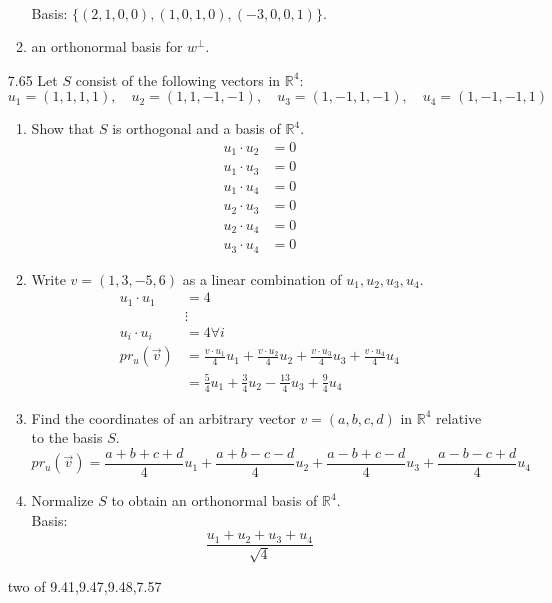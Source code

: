 \documentclass[12pt]{article}
\theoremstyle{definition}
\theoremstyle{plain}
\begin{document}
\begin{enumerate}
\begin{enumerate}
\begin{align*}
		\end{align*}
		Basis: $\{(2,1,0,0),(1,0,1,0),(-3,0,0,1)\}$.
	\item an orthonormal basis for $w^\perp$.
	\end{enumerate}
\item[7.65]Let $S$ consist of the following vectors in $\mathbb{R}^4$:
\[ u_1=(1,1,1,1), \quad u_2=(1,1,-1,-1), \quad u_3=(1,-1,1,-1), \quad u_4=(1,-1,-1,1) \]
	\begin{enumerate}
	\item Show that $S$ is orthogonal and a basis of $\mathbb{R}^4$.\\
		\begin{align*}
		u_1\cdot u_2&=0\\
		u_1\cdot u_3 &= 0\\
		u_1\cdot u_4 &= 0\\
		u_2\cdot u_3 &= 0\\
		u_2\cdot u_4 &= 0\\
		u_3\cdot u_4&= 0
		\end{align*}
	\item Write $v=(1,3,-5,6)$ as a linear combination of $u_1,u_2,u_3,u_4$.
		\begin{align*}
		u_1\cdot u_1 &= 4\\
		&\vdots\\
		u_i\cdot u_i &= 4 \forall i\\
		pr_u(\vec{v})&=\frac{v\cdot u_1}{4}u_1+\frac{v\cdot u_2}{4}u_2+\frac{v\cdot u_3}{4}u_3+\frac{v\cdot u_4}{4}u_4\\
		&=\frac{5}{4}u_1+\frac{3}{4}u_2-\frac{13}{4}u_3+\frac{9}{4}u_4
		\end{align*}
	\item Find the coordinates of an arbitrary vector $v=(a,b,c,d)$ in $\mathbb{R}^4$ relative to the basis $S$.\\
		\[ pr_u(\vec{v}) = \frac{a+b+c+d}{4}u_1+\frac{a+b-c-d}{4}u_2+\frac{a-b+c-d}{4}u_3+\frac{a-b-c+d}{4}u_4 \]
	\item Normalize $S$ to obtain an orthonormal basis of $\mathbb{R}^4$.\\
		Basis: 
		\[ \frac{u_1+u_2+u_3+u_4}{\sqrt{4}} \]
	\end{enumerate}


two of 9.41,9.47,9.48,7.57






\end{enumerate}
\end{document}
